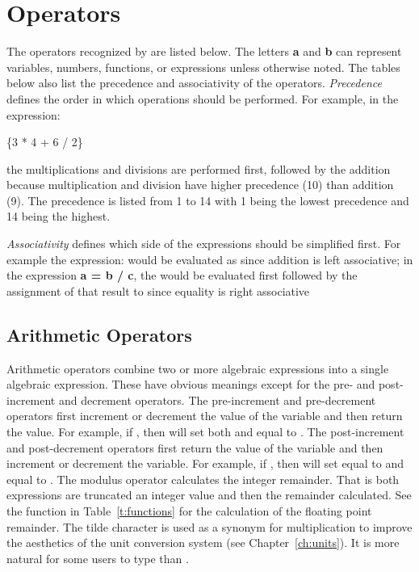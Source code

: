 \chapter{Operators}\label{ch:operators}

The operators recognized by \aprepro{} are listed below. The letters \textbf{a} 
and \textbf{b} can represent variables, numbers, functions, or expressions unless 
otherwise noted. The tables below also list the precedence and associativity of 
the operators. {\em Precedence} defines the order in which operations should be performed. 
For example, in the expression:
\begin{apinp}
\{3 * 4 + 6 / 2\}
\end{apinp}
the multiplications and divisions are performed first, followed by the addition 
because multiplication and division have higher precedence (10) than addition (9). The precedence 
is listed from 1 to 14 with 1 being the lowest precedence and 14 being the highest.

{\em Associativity} defines which side of the expressions should be
simplified first.  For example the expression:  would
be evaluated as  since addition is left associative;
in the expression \textbf{a = b / c}, the  would be evaluated
first followed by the assignment of that result to  since
equality is right associative

\section{Arithmetic Operators}

Arithmetic operators combine two or more algebraic expressions into a
single algebraic expression. These have obvious meanings except for
the pre- and post- increment and decrement operators. The
pre-increment and pre-decrement operators first increment or decrement
the value of the variable and then return the value. For example, if
, then  will set both  and  equal to . The post-increment and
post-decrement operators first return the value of the
variable and then increment or decrement the variable. For example, if
, then  will set
 equal to  and  equal to . The
modulus operator \cmd{\%} calculates the integer remainder. That is
both expressions are truncated an integer value and then the remainder
calculated. See the  function in Table~\ref{t:functions} for
the calculation of the floating point remainder. The tilde character
\cmd{\textasciitilde{}} is used as a synonym for multiplication to
improve the aesthetics of the unit conversion system (see
Chapter~\ref{ch:units}). It is more natural for some users to type
 than .


